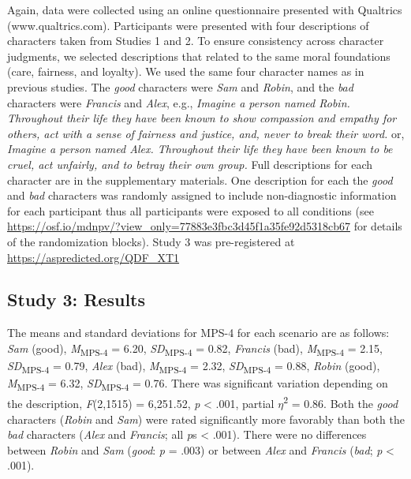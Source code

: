 \documentclass[
  man,floatsintext]{apa6}
\begin{document}
Again, data were collected using an online questionnaire presented with Qualtrics (www.qualtrics.com). Participants were presented with four descriptions of characters taken from Studies 1 and 2. To ensure consistency across character judgments, we selected descriptions that related to the same moral foundations (care, fairness, and loyalty). We used the same four character names as in previous studies. The \emph{good} characters were \emph{Sam} and \emph{Robin}, and the \emph{bad} characters were \emph{Francis} and \emph{Alex}, e.g., \emph{Imagine a person named Robin. Throughout their life they have been known to show compassion and empathy for others, act with a sense of fairness and justice, and, never to break their word.} or, \emph{Imagine a person named Alex. Throughout their life they have been known to be cruel, act unfairly, and to betray their own group.} Full descriptions for each character are in the supplementary materials. One description for each the \emph{good} and \emph{bad} characters was randomly assigned to include non-diagnostic information for each participant thus all participants were exposed to all conditions (see \color{blue}\url{https://osf.io/mdnpv/?view_only=77883e3fbc3d45f1a35fe92d5318cb67}\color{black} for details of the randomization blocks). Study 3 was pre-registered at \color{blue}\url{https://aspredicted.org/QDF_XT1}\color{black}

\subsection{Study 3: Results}\label{study-3-results}

The means and standard deviations for MPS-4 for each scenario are as follows:
\emph{Sam} (good),
\emph{M}\textsubscript{MPS-4} = 6.20, \emph{SD}\textsubscript{MPS-4} = 0.82,
\emph{Francis} (bad),
\emph{M}\textsubscript{MPS-4} = 2.15, \emph{SD}\textsubscript{MPS-4} = 0.79,
\emph{Alex} (bad),
\emph{M}\textsubscript{MPS-4} = 2.32, \emph{SD}\textsubscript{MPS-4} = 0.88,
\emph{Robin} (good),
\emph{M}\textsubscript{MPS-4} = 6.32, \emph{SD}\textsubscript{MPS-4} = 0.76. There was significant variation depending on the description, \emph{F}(2,1515) = 6,251.52, \emph{p} \textless{} .001, partial \(\eta\)\textsuperscript{2} = 0.86. Both the \emph{good} characters (\emph{Robin} and \emph{Sam}) were rated significantly more favorably than both the \emph{bad} characters (\emph{Alex} and \emph{Francis}; all \emph{p}s \textless{} .001). There were no differences between \emph{Robin} and \emph{Sam} (\emph{good}: \emph{p} = .003) or between \emph{Alex} and \emph{Francis} (\emph{bad}; \emph{p} \textless{} .001).
\end{document}
